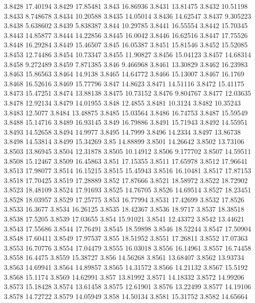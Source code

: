 3.8428  17.40194
3.8429  17.85481
3.843  16.86936
3.8431  13.81475
3.8432  10.51198
3.8433  8.748678
3.8434  10.20588
3.8435  14.05014
3.8436  14.62547
3.8437  9.305223
3.8438  5.638602
3.8439  5.838387
3.844  10.29785
3.8441  16.55554
3.8442  15.70345
3.8443  14.85877
3.8444  14.22856
3.8445  16.0042
3.8446  16.62516
3.8447  17.75526
3.8448  16.29284
3.8449  15.46507
3.845  16.05387
3.8451  15.81546
3.8452  15.52085
3.8453  12.74486
3.8454  10.73347
3.8455  11.90827
3.8456  15.04123
3.8457  14.68314
3.8458  9.272489
3.8459  7.871385
3.846  9.466968
3.8461  13.30829
3.8462  16.23983
3.8463  15.86563
3.8464  14.9138
3.8465  14.64772
3.8466  15.13007
3.8467  16.1769
3.8468  16.52616
3.8469  15.77796
3.847  14.8623
3.8471  14.51116
3.8472  15.41175
3.8473  15.47251
3.8474  13.88138
3.8475  10.73152
3.8476  9.804767
3.8477  12.03635
3.8478  12.92134
3.8479  14.01955
3.848  12.4855
3.8481  10.3124
3.8482  10.35243
3.8483  12.5077
3.8484  13.48875
3.8485  15.03564
3.8486  16.74753
3.8487  15.59549
3.8488  15.14716
3.8489  16.93145
3.849  16.79886
3.8491  15.71943
3.8492  14.55951
3.8493  14.52658
3.8494  14.9977
3.8495  14.7999
3.8496  14.2334
3.8497  13.86738
3.8498  14.53814
3.8499  15.34269
3.85  14.88899
3.8501  14.26642
3.8502  13.73106
3.8503  13.86945
3.8504  12.31878
3.8505  10.14912
3.8506  9.177702
3.8507  14.59511
3.8508  15.12467
3.8509  16.45863
3.851  17.15355
3.8511  17.65978
3.8512  17.96641
3.8513  17.98077
3.8514  16.15215
3.8515  15.45943
3.8516  16.10481
3.8517  17.87153
3.8518  17.70425
3.8519  17.28889
3.852  17.87666
3.8521  18.58972
3.8522  18.72902
3.8523  18.48109
3.8524  17.91693
3.8525  14.76705
3.8526  14.69514
3.8527  18.23451
3.8528  18.03957
3.8529  17.25775
3.853  16.77994
3.8531  17.42699
3.8532  17.8526
3.8533  16.3677
3.8534  16.26125
3.8535  18.42367
3.8536  18.9717
3.8537  18.38518
3.8538  17.5205
3.8539  17.03655
3.854  15.91021
3.8541  12.43372
3.8542  13.44621
3.8543  17.55686
3.8544  17.76491
3.8545  18.59898
3.8546  18.52244
3.8547  17.50904
3.8548  17.60411
3.8549  17.97537
3.855  18.51952
3.8551  17.26811
3.8552  17.07363
3.8553  16.70776
3.8554  17.04479
3.8555  16.03018
3.8556  16.14961
3.8557  16.74458
3.8558  16.4475
3.8559  15.38727
3.856  14.56268
3.8561  13.68407
3.8562  13.93734
3.8563  14.69941
3.8564  14.89857
3.8565  14.31572
3.8566  14.21132
3.8567  15.5192
3.8568  15.1174
3.8569  14.62991
3.857  13.81992
3.8571  14.18332
3.8572  14.99206
3.8573  15.18428
3.8574  13.61458
3.8575  12.61901
3.8576  13.22499
3.8577  14.19106
3.8578  14.72722
3.8579  14.05949
3.858  14.50134
3.8581  15.31752
3.8582  14.65664
